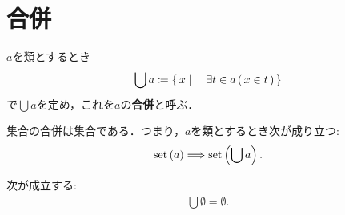 \section{合併}
	\begin{screen}
		\begin{dfn}[合併]
			$a$を類とするとき
			\begin{align}
				\bigcup a \coloneqq \left\{\, x \mid \quad \exists t \in a\, (\, x \in t\, )\, \right\}
				\label{eq:definition_of_union_1}
			\end{align}
			で$\bigcup a$を定め，これを$a$の{\bf 合併}と呼ぶ．
		\end{dfn}
	\end{screen}
	
	\begin{screen}
		\begin{axm}[合併の公理]
			集合の合併は集合である．つまり，$a$を類とするとき次が成り立つ:
			\begin{align}
				\operatorname*{set} \left(a\right) \Longrightarrow \operatorname*{set} \left(\bigcup a\right).
			\end{align}
		\end{axm}
	\end{screen}
	
	\begin{screen}
		\begin{thm}[空集合の合併は空]\label{thm:the_union_of_the_emptyset_is_empty}
			次が成立する:
			\begin{align}
				\bigcup \emptyset = \emptyset.
			\end{align}
		\end{thm}
	\end{screen}
	
